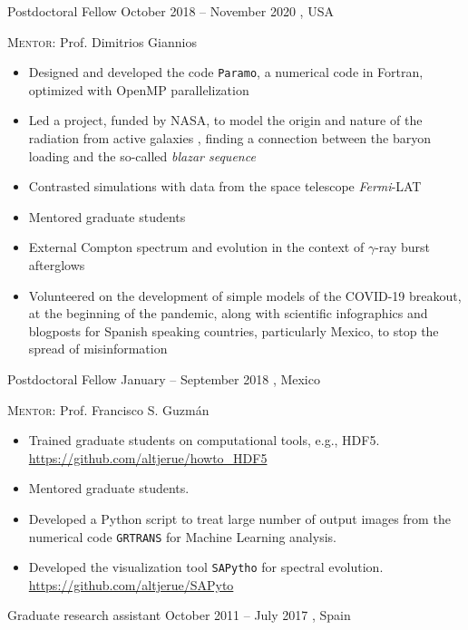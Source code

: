 \cventry{}%
{\DPA}%
{Postdoctoral Fellow}%
{October 2018 -- November 2020}%
{\Purdue, USA}%
{\textsc{Mentor}: Prof. Dimitrios Giannios%
  \begin{itemize}
    \item Designed and developed the code \texttt{Paramo}, a numerical code in Fortran, optimized with OpenMP parallelization
    \item Led a project, funded by NASA, to model the origin and nature of the radiation from active galaxies \cite{RuedaBecerril:2020ha}, finding a connection between the baryon loading and the so-called \emph{blazar sequence}
    \item Contrasted simulations with data from the space telescope \emph{Fermi}-LAT \cite{RuedaBecerril:2021ha}
    \item Mentored graduate students
    \item External Compton spectrum and evolution in the context of $\gamma$-ray burst afterglows \cite{Zhang:2020ch}
    \item Volunteered on the development of simple models of the COVID-19 breakout, at the beginning of the pandemic, along with scientific infographics and blogposts for Spanish speaking countries, particularly Mexico, to stop the spread of misinformation
  \end{itemize}
}
\cventry{}%
{\IFMes}%
{Postdoctoral Fellow}%
{\hspace{-30ex}January -- September 2018}%
{\UMSNHes, Mexico}%
{\textsc{Mentor}: Prof. Francisco S. Guzmán
  \begin{itemize}
    \item Trained graduate students on computational tools, e.g., HDF5. \url{https://github.com/altjerue/howto_HDF5}
    \item Mentored graduate students.
    \item Developed a Python script to treat large number of output images from the numerical code \texttt{GRTRANS} for Machine Learning analysis.
    \item Developed the visualization tool \texttt{SAPytho} for spectral evolution. \url{https://github.com/altjerue/SAPyto}
  \end{itemize}
}
\cventry{}%
{\DAAval}%
{Graduate research assistant}%
{October 2011 -- July 2017}%
{\UVval, Spain}%
